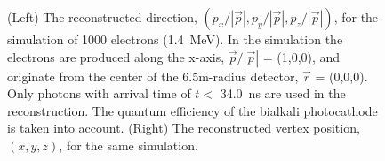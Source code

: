 \documentclass[cits]{JINST}
\begin{document}
\begin{figure}[tbh]
        \begin{center}
        \caption[]{(Left) The reconstructed direction,
        $(p_x/|\vec{p}|, p_y/|\vec{p}|,
        p_z/|\vec{p}|)$, for the simulation of 1000 electrons
        (1.4~MeV). In the simulation the electrons are produced along the
        x-axis, $\vec{p}/|\vec{p}|$ = (1,0,0), and originate
        from the center of the 6.5m-radius detector, $\vec{r}$ =
        (0,0,0). Only photons with arrival time of $t<$ 34.0~ns are used
        in the reconstruction. The quantum efficiency of the bialkali
        photocathode is taken into account. (Right) The reconstructed
        vertex position, $(x,y,z)$, for the same simulation. \label{low_energy_reco}}
\end{center}
\end{figure}
\end{document}
